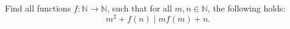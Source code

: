 Find all functions $f\colon\mathbb{N} \to \mathbb{N}$, such that for all $m,n\in \mathbb{N}$,
the following holds:
$$m^2+f(n)\mid mf(m)+n.$$
